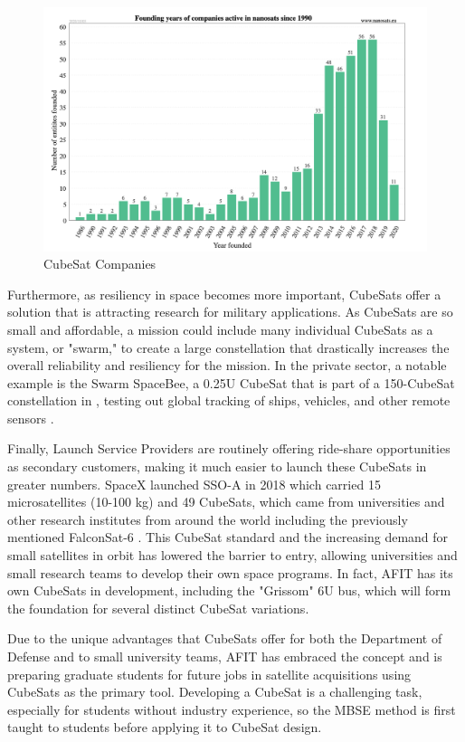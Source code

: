 \begin{figure}[H]
    \centering
    \includegraphics[width=\textwidth]{Thesis/Literature_Review/Lit Review Figures/CubeSat companies.png}
    \caption{CubeSat Companies}
    \label{fig:CubeSat Companies}
\end{figure}

Furthermore, as resiliency in space becomes more important, CubeSats offer a solution that is attracting research for military applications. As CubeSats are so small and affordable, a mission could include many individual CubeSats as a system, or "swarm," to create a large constellation that drastically increases the overall reliability and resiliency for the mission. In the private sector, a notable example is the Swarm SpaceBee, a 0.25U CubeSat that is part of a 150-CubeSat constellation in , testing out global  tracking of ships, vehicles, and other remote sensors \citep{Harris2019}. 

Finally, Launch Service Providers are routinely offering ride-share opportunities as secondary customers, making it much easier to launch these CubeSats in greater numbers. SpaceX launched SSO-A in 2018 which carried 15 microsatellites (10-100 kg) and 49 CubeSats, which came from universities and other research institutes from around the world including the previously mentioned FalconSat-6 \citep{eoPortal}. This CubeSat standard and the increasing demand for small satellites in orbit has lowered the barrier to entry, allowing universities and small research teams to develop their own space programs. In fact, AFIT has its own CubeSats in development, including the "Grissom" 6U bus, which will form the foundation for several distinct CubeSat variations.

Due to the unique advantages that CubeSats offer for both the Department of Defense and to small university teams, AFIT has embraced the concept and is preparing graduate students for future jobs in satellite acquisitions using CubeSats as the primary tool. Developing a CubeSat is a challenging task, especially for students without industry experience, so the MBSE method is first taught to students before applying it to CubeSat design.





